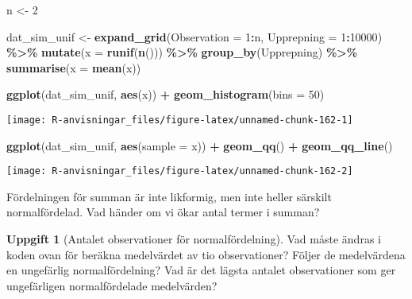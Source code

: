 \documentclass[
]{book}
\newenvironment{Shaded}{\begin{snugshade}}{\end{snugshade}}
\newcommand{\AttributeTok}[1]{\textcolor[rgb]{0.13,0.29,0.53}{#1}}
\newcommand{\DecValTok}[1]{\textcolor[rgb]{0.00,0.00,0.81}{#1}}
\newcommand{\FunctionTok}[1]{\textcolor[rgb]{0.13,0.29,0.53}{\textbf{#1}}}
\newcommand{\NormalTok}[1]{#1}
\newcommand{\OtherTok}[1]{\textcolor[rgb]{0.56,0.35,0.01}{#1}}
\newcommand{\SpecialCharTok}[1]{\textcolor[rgb]{0.81,0.36,0.00}{\textbf{#1}}}
\theoremstyle{definition}
\theoremstyle{definition}
\theoremstyle{definition}
\newtheorem{exercise}{Uppgift}[chapter]
\theoremstyle{definition}
\theoremstyle{remark}
\begin{document}
\begin{Shaded}
\begin{Highlighting}[]
\NormalTok{n }\OtherTok{\textless{}{-}} \DecValTok{2}

\NormalTok{dat\_sim\_unif }\OtherTok{\textless{}{-}} \FunctionTok{expand\_grid}\NormalTok{(}\AttributeTok{Observation =} \DecValTok{1}\SpecialCharTok{:}\NormalTok{n, }\AttributeTok{Upprepning =} \DecValTok{1}\SpecialCharTok{:}\DecValTok{10000}\NormalTok{) }\SpecialCharTok{\%\textgreater{}\%} 
  \FunctionTok{mutate}\NormalTok{(}\AttributeTok{x =} \FunctionTok{runif}\NormalTok{(}\FunctionTok{n}\NormalTok{())) }\SpecialCharTok{\%\textgreater{}\%} 
  \FunctionTok{group\_by}\NormalTok{(Upprepning) }\SpecialCharTok{\%\textgreater{}\%} 
  \FunctionTok{summarise}\NormalTok{(}\AttributeTok{x =} \FunctionTok{mean}\NormalTok{(x))}

\FunctionTok{ggplot}\NormalTok{(dat\_sim\_unif, }\FunctionTok{aes}\NormalTok{(x)) }\SpecialCharTok{+} \FunctionTok{geom\_histogram}\NormalTok{(}\AttributeTok{bins =} \DecValTok{50}\NormalTok{)}
\end{Highlighting}
\end{Shaded}

\begin{center}\texttt{[image: R-anvisningar\_files/figure-latex/unnamed-chunk-162-1]} \end{center}

\begin{Shaded}
\begin{Highlighting}[]
\FunctionTok{ggplot}\NormalTok{(dat\_sim\_unif, }\FunctionTok{aes}\NormalTok{(}\AttributeTok{sample =}\NormalTok{ x)) }\SpecialCharTok{+} \FunctionTok{geom\_qq}\NormalTok{() }\SpecialCharTok{+} \FunctionTok{geom\_qq\_line}\NormalTok{()}
\end{Highlighting}
\end{Shaded}

\begin{center}\texttt{[image: R-anvisningar\_files/figure-latex/unnamed-chunk-162-2]} \end{center}

Fördelningen för summan är inte likformig, men inte heller särskilt normalfördelad. Vad händer om vi ökar antal termer i summan?

\begin{exercise}[Antalet observationer för normalfördelning]
Vad måste ändras i koden ovan för beräkna medelvärdet av tio observationer? Följer de medelvärdena en ungefärlig normalfördelning? Vad är det lägsta antalet observationer som ger ungefärligen normalfördelade medelvärden?
\end{exercise}
\end{document}
